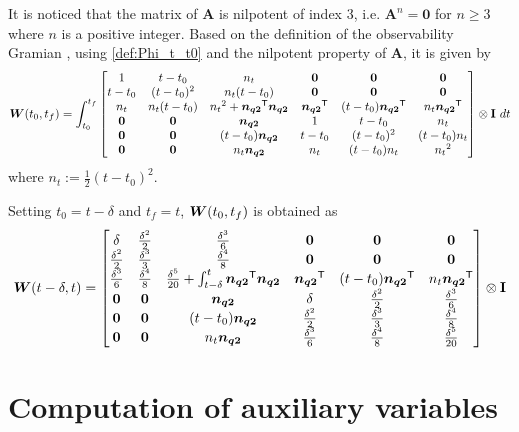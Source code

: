 \documentclass[journal,onecolumn]{IEEEtran}
\begin{document}
It is noticed that the matrix of ${\mathbf A}$ is nilpotent of index 3, i.e. ${\mathbf A}^n={\mathbf 0}$ for $n\geq3$ where $n$ is a positive integer.
Based on the definition of the observability Gramian , using \eqref{def:Phi_t_t0} and the nilpotent property of ${\mathbf A}$, it is given by
%
	\begin{align}
		\boldsymbol{W}(t_0,t_f)=\int_{t_0}^{t_f}
		\begin{bmatrix}
			1  & t-t_0 & n_t  & {\bf 0} & {\bf 0} & {\bf 0} \\
			t-t_0 & (t-t_0)^2 & n_t(t-t_0) & {\bf 0} & {\bf 0} & {\bf 0} \\
			n_t & n_t(t-t_0) & {n_t}^2+\boldsymbol{n_{q2}}^\mathsf{T}\boldsymbol{n_{q2}} & \boldsymbol{n_{q2}}^\mathsf{T} & (t-t_0)\boldsymbol{n_{q2}}^\mathsf{T} & n_t\boldsymbol{n_{q2}}^\mathsf{T}\\
			{\bf 0} & {\bf 0} & \boldsymbol{n_{q2}}  & 1  & t-t_0 & n_t\\
			{\bf 0} & {\bf 0} & (t-t_0)\boldsymbol{n_{q2}} & t-t_0 & (t-t_0)^2 & (t-t_0)n_t\\
			{\bf 0} & {\bf 0} & n_t\boldsymbol{n_{q2}} & n_t & (t-t_0)n_t & {n_t}^2
		\end{bmatrix}\otimes {\bf I}~dt
		\label{eq:W_t0_tf}
	\end{align}
%
where $n_t:=\frac{1}{2}(t-{t_0})^2$.

Setting $t_0=t-\delta$ and $t_f=t$, $\boldsymbol{W}(t_0,t_f)$ is obtained as
%
	\begin{align}
		\boldsymbol{W}(t-\delta,t)=
		\begin{bmatrix}
			\delta  & \frac{\delta^2}{2} & \frac{\delta^3}{6}  & {\bf 0} & {\bf 0} & {\bf 0} \\
			\frac{\delta^2}{2} & \frac{\delta^3}{3} & \frac{\delta^4}{8} & {\bf 0} & {\bf 0} & {\bf 0} \\
			\frac{\delta^3}{6} & \frac{\delta^4}{8} & \frac{\delta^5}{20}+\int_{t-\delta}^{t}\boldsymbol{n_{q2}}^\mathsf{T}\boldsymbol{n_{q2}} & \boldsymbol{n_{q2}}^\mathsf{T} & (t-t_0)\boldsymbol{n_{q2}}^\mathsf{T} & n_t\boldsymbol{n_{q2}}^\mathsf{T}\\
			{\bf 0} & {\bf 0} & \boldsymbol{n_{q2}}  & \delta  & \frac{\delta^2}{2} & \frac{\delta^3}{6}\\
			{\bf 0} & {\bf 0} & (t-t_0)\boldsymbol{n_{q2}} & \frac{\delta^2}{2} & \frac{\delta^3}{3} & \frac{\delta^4}{8}\\
			{\bf 0} & {\bf 0} & n_t\boldsymbol{n_{q2}} & \frac{\delta^3}{6} & \frac{\delta^4}{8} & \frac{\delta^5}{20}
		\end{bmatrix}\otimes {\bf I}
		\label{eq:W_t_delta}
	\end{align}

\section{Computation of auxiliary variables}
\label{sec:aux_notation}
\end{document}
